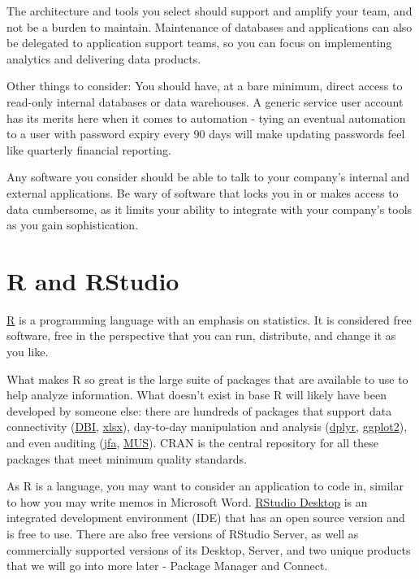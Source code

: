 \documentclass[
]{book}
\begin{document}
The architecture and tools you select should support and amplify your team, and not be a burden to maintain. Maintenance of databases and applications can also be delegated to application support teams, so you can focus on implementing analytics and delivering data products.

Other things to consider: You should have, at a bare minimum, direct access to read-only internal databases or data warehouses. A generic service user account has its merits here when it comes to automation - tying an eventual automation to a user with password expiry every 90 days will make updating passwords feel like quarterly financial reporting.

Any software you consider should be able to talk to your company's internal and external applications. Be wary of software that locks you in or makes access to data cumbersome, as it limits your ability to integrate with your company's tools as you gain sophistication.

\hypertarget{r-and-rstudio}{%
\section{R and RStudio}\label{r-and-rstudio}}

\href{https://www.r-project.org}{R} is a programming language with an emphasis on statistics. It is considered free software, free in the perspective that you can run, distribute, and change it as you like.

What makes R so great is the large suite of packages that are available to use to help analyze information. What doesn't exist in base R will likely have been developed by someone else: there are hundreds of packages that support data connectivity (\href{https://cran.r-project.org/web/packages/DBI/}{DBI}, \href{https://cran.r-project.org/web/packages/xlsx/}{xlsx}), day-to-day manipulation and analysis (\href{https://cran.r-project.org/web/packages/dplyr/}{dplyr}, \href{https://cran.r-project.org/web/packages/ggplot2/}{ggplot2}), and even auditing (\href{https://cran.r-project.org/web/packages/jfa/}{jfa}, \href{https://cran.r-project.org/web/packages/MUS/}{MUS}). CRAN is the central repository for all these packages that meet minimum quality standards.

As R is a language, you may want to consider an application to code in, similar to how you may write memos in Microsoft Word. \href{https://rstudio.com}{RStudio Desktop} is an integrated development environment (IDE) that has an open source version and is free to use. There are also free versions of RStudio Server, as well as commercially supported versions of its Desktop, Server, and two unique products that we will go into more later - Package Manager and Connect.
\end{document}
